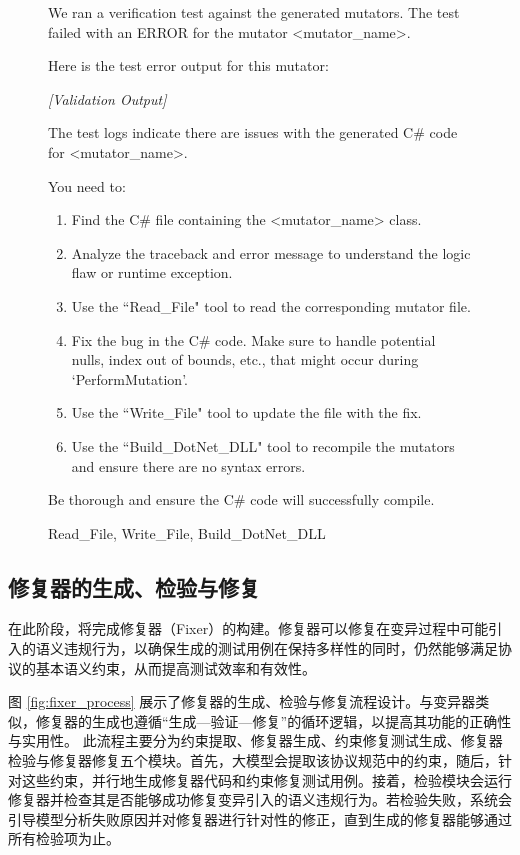 \begin{figure}[H]
\centering
\begin{tcolorbox}[
  before upper=\linespread{1.2}\selectfont
]
 We ran a verification test against the generated mutators. The test failed with an ERROR for the mutator <mutator\_name>.

Here is the test error output for this mutator:

\textit{[Validation Output]}

The test logs indicate there are issues with the generated C\# code for <mutator\_name>. 

You need to:
\begin{enumerate}[noitemsep]
    \item Find the C\# file containing the <mutator\_name> class.
    \item Analyze the traceback and error message to understand the logic flaw or runtime exception.
    \item Use the ``Read\_File" tool to read the corresponding mutator file.
    \item Fix the bug in the C\# code. Make sure to handle potential nulls, index out of bounds, etc., that might occur during `PerformMutation'.
    \item Use the ``Write\_File" tool to update the file with the fix.
    \item Use the ``Build\_DotNet\_DLL" tool to recompile the mutators and ensure there are no syntax errors.
\end{enumerate}

Be thorough and ensure the C\# code will successfully compile.

\prule

 Read\_File, Write\_File, Build\_DotNet\_DLL
\end{tcolorbox}
\label{fig:prompt_mutator_repair}
\end{figure}

\subsection{修复器的生成、检验与修复}

在此阶段，将完成修复器（Fixer）的构建。修复器可以修复在变异过程中可能引入的语义违规行为，以确保生成的测试用例在保持多样性的同时，仍然能够满足协议的基本语义约束，从而提高测试效率和有效性。

图 \ref{fig:fixer_process} 展示了修复器的生成、检验与修复流程设计。与变异器类似，修复器的生成也遵循“生成—验证—修复”的循环逻辑，以提高其功能的正确性与实用性。
此流程主要分为约束提取、修复器生成、约束修复测试生成、修复器检验与修复器修复五个模块。首先，大模型会提取该协议规范中的约束，随后，针对这些约束，并行地生成修复器代码和约束修复测试用例。接着，检验模块会运行修复器并检查其是否能够成功修复变异引入的语义违规行为。若检验失败，系统会引导模型分析失败原因并对修复器进行针对性的修正，直到生成的修复器能够通过所有检验项为止。

